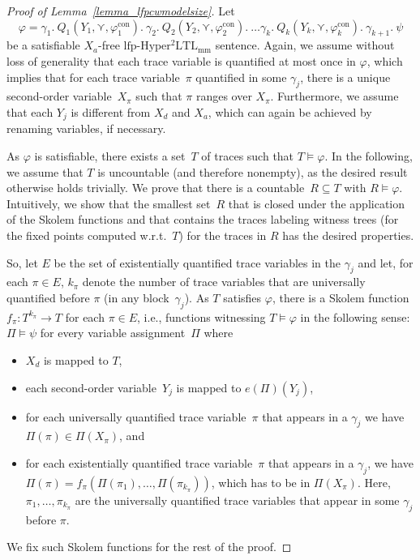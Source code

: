 \documentclass[dvipsnames,10pt,a4paper]{amsart}
\theoremstyle{definition}
\theoremstyle{remark}
\renewcommand{\phi}{\varphi}
\newcommand{\lfpsohyltlfp}{\mathrm{lfp\text{-}{Hyper^2LTL_{\mathrm{mm}}}}\xspace}
\newcommand{\univar}{X_a}
\newcommand{\unidisvar}{X_d}
\newcommand{\smallest}{\curlyvee}
\newcommand{\con}{\mathrm{con}}
\newcommand{\quant}{Q}
\newcommand{\itereval}{e}
\begin{document}
\begin{proof}[Proof of Lemma~\ref{lemma_lfpcwmodelsize}]
Let \[
\phi = 
\gamma_1.\ \quant_1(Y_1, \smallest, \phi_1^\con).\ 
\gamma_2.\ \quant_2(Y_2, \smallest, \phi_2^\con).\ 
\ldots 
\gamma_k.\ \quant_k(Y_k, \smallest, \phi_k^\con).\
\gamma_{k+1}.\
\psi
\]
be a satisfiable $\univar$-free $\lfpsohyltlfp$ sentence.
Again, we assume without loss of generality that each trace variable is quantified at most once in $\varphi$, which implies that for each trace variable~$\pi$ quantified in some $\gamma_j$, there is a unique second-order variable~$X_\pi$ such that $\pi$ ranges over $X_\pi$.
Furthermore, we assume that each $Y_j$ is different from $\unidisvar$ and $\univar$, which can again be achieved by renaming variables, if necessary.

As $\varphi$ is satisfiable, there exists a set~$T$ of traces such that $T \models\phi$. 
In the following, we assume that $T$ is uncountable (and therefore nonempty), as the desired result otherwise holds trivially.
We prove that there is a countable~$R \subseteq T$ with $R\models\varphi$.
Intuitively, we show that the smallest set~$R$ that is closed under the application of the Skolem functions and that contains the traces labeling witness trees (for the fixed points computed w.r.t.\ $T$) for the traces in $R$ has the desired properties.

So, let $E$ be the set of existentially quantified trace variables in the $\gamma_j$ and let, for each $\pi \in E$, $k_\pi$ denote the number of trace variables that are universally quantified before $\pi$ (in any block~$\gamma_j$).
As $T$ satisfies $\phi$, there is a Skolem function~$f_{\pi} \colon T^{k_\pi} \rightarrow T$ for each  $\pi \in E$, i.e., functions witnessing $T\models \varphi$ in the following sense: $\Pi\models\psi$ for every variable assignment~$\Pi$ where 
\begin{itemize}
    \item $\unidisvar$ is mapped to $T$,
    \item each second-order variable~$Y_j$ is mapped to $\itereval(\Pi)(Y_j)$,
    \item for each universally quantified trace variable~$\pi$ that appears in a $\gamma_j$ we have $\Pi(\pi) \in \Pi(X_\pi)$, and
    \item for each existentially quantified trace variable~$\pi$ that appears in a $\gamma_j$, we have $\Pi(\pi) = f_{\pi}(\Pi(\pi_1), \ldots, \Pi(\pi_{k_\pi}))$, which has to be in $\Pi(X_\pi)$. Here, $\pi_1, \ldots, \pi_{k_\pi}$ are the universally quantified trace variables  that appear in some $\gamma_j$ before $\pi$.
\end{itemize}
We fix such Skolem functions for the rest of the proof. 


\end{proof}
\end{document}
